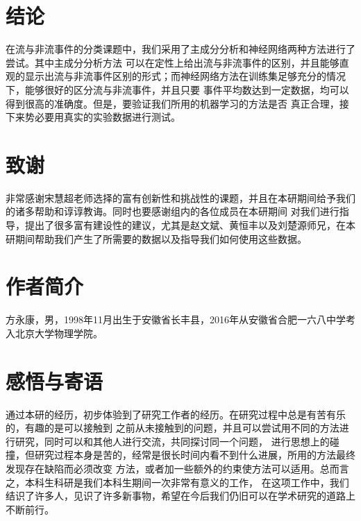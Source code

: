 \documentclass[aps,pre,12pt,preprint,onecolumn,showpacs,showkeys]{revtex4-1}
\begin{document}
\section{结论}
在流与非流事件的分类课题中，我们采用了主成分分析和神经网络两种方法进行了尝试。其中主成分分析方法
可以在定性上给出流与非流事件的区别，并且能够直观的显示出流与非流事件区别的形式；而神经网络方法在训练集足够充分的情况下，能够很好的区分流与非流事件，并且只要
事件平均数达到一定数据，均可以得到很高的准确度。但是，要验证我们所用的机器学习的方法是否
真正合理，接下来势必要用真实的实验数据进行测试。

\section{致谢}
非常感谢宋慧超老师选择的富有创新性和挑战性的课题，并且在本研期间给予我们的诸多帮助和谆谆教诲。同时也要感谢组内的各位成员在本研期间
对我们进行指导，提出了很多富有建设性的建议，尤其是赵文斌、黄恒丰以及刘楚源师兄，在本研期间帮助我们产生了所需要的数据以及指导我们如何使用这些数据。



%
%
%
%
%
%
%
%
%
%
%
%
%
%
%



\section{\heiti{}作者简介}
方永康，男，1998年11月出生于安徽省长丰县，2016年从安徽省合肥一六八中学考入北京大学物理学院。

\section{\heiti{}感悟与寄语}
通过本研的经历，初步体验到了研究工作者的经历。在研究过程中总是有苦有乐的，有趣的是可以接触到
之前从未接触到的问题，并且可以尝试用不同的方法进行研究，同时可以和其他人进行交流，共同探讨同一个问题，
进行思想上的碰撞，但研究过程本身是苦的，经常是很长时间内看不到什么进展，所用的方法最终发现存在缺陷而必须改变
方法，或者加一些额外的约束使方法可以适用。总而言之，本科生科研是我们本科生期间一次非常有意义的工作，
在这项工作中，我们结识了许多人，见识了许多新事物，希望在今后我们仍旧可以在学术研究的道路上不断前行。
\end{document}
